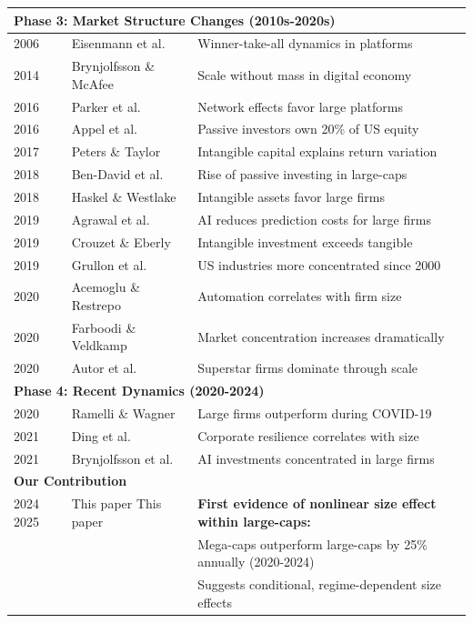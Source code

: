 \documentclass[10pt,letterpaper]{article}
\begin{document}
\begin{longtable}{p{2cm}p{3.5cm}p{6cm}}
\hline
\multicolumn{3}{l}{\textbf{Phase 3: Market Structure Changes (2010s-2020s)}} \\
\hline
2006 & Eisenmann et al.~\cite{eisenmann2006} & Winner-take-all dynamics in platforms \\
2014 & Brynjolfsson \& McAfee~\cite{brynjolfsson2014} & Scale without mass in digital economy \\
2016 & Parker et al.~\cite{parker2016} & Network effects favor large platforms \\
2016 & Appel et al.~\cite{appel2016} & Passive investors own 20\% of US equity \\
2017 & Peters \& Taylor~\cite{peters2017} & Intangible capital explains return variation \\
2018 & Ben-David et al.~\cite{bendavid2018} & Rise of passive investing in large-caps \\
2018 & Haskel \& Westlake~\cite{haskel2018} & Intangible assets favor large firms \\
2019 & Agrawal et al.~\cite{agrawal2019} & AI reduces prediction costs for large firms \\
2019 & Crouzet \& Eberly~\cite{crouzet2019} & Intangible investment exceeds tangible \\
2019 & Grullon et al.~\cite{grullon2019} & US industries more concentrated since 2000 \\
2020 & Acemoglu \& Restrepo~\cite{acemoglu2020} & Automation correlates with firm size \\
2020 & Farboodi \& Veldkamp~\cite{farboodi2020} & Market concentration increases dramatically \\
2020 & Autor et al.~\cite{autor2020} & Superstar firms dominate through scale \\
\hline
\multicolumn{3}{l}{\textbf{Phase 4: Recent Dynamics (2020-2024)}} \\
\hline
2020 & Ramelli \& Wagner~\cite{ramelli2020} & Large firms outperform during COVID-19 \\
2021 & Ding et al.~\cite{ding2021} & Corporate resilience correlates with size \\
2021 & Brynjolfsson et al.~\cite{brynjolfsson2021} & AI investments concentrated in large firms \\
\hline
\multicolumn{3}{l}{\textbf{Our Contribution}} \\
\hline
2024 2025 & This paper This paper & \textbf{First evidence of nonlinear size effect within large-caps:} \\
 & & Mega-caps outperform large-caps by 25\% annually (2020-2024) \\
 & & Suggests conditional, regime-dependent size effects \\
\end{longtable}
\end{document}
